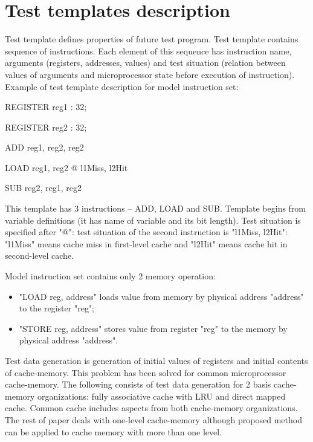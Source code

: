 \section{Test templates description}

Test template defines properties of future test program. Test
template contains sequence of instructions. Each element of this
sequence has instruction name, arguments (registers, addresses,
values) and test situation (relation between values of arguments and
microprocessor state before execution of instruction). Example of
test template description for model instruction set:

REGISTER reg1 : 32;

REGISTER reg2 : 32;

ADD reg1, reg2, reg2

LOAD reg1, reg2 @ l1Miss, l2Hit

SUB reg2, reg1, reg2

This template has 3 instructions -- ADD, LOAD and SUB. Template
begins from variable definitions (it has name of variable and its
bit length). Test situation is specified after "@": test situation
of the second instruction is "l1Miss, l2Hit": "l1Miss" means cache
miss in first-level cache and "l2Hit" means cache hit in
second-level cache.

Model instruction set contains only 2 memory operation:
\begin{itemize}
\item "LOAD reg, address" loads value from memory by physical address
"address" to the register "reg";
\item "STORE reg, address" stores value from register "reg" to the
memory by physical address "address".
\end{itemize}

Test data generation is generation of initial values of registers
and initial contents of cache-memory. This problem has been solved
for common microprocessor cache-memory. The following consists of
test data generation for 2 basis cache-memory organizations: fully
associative cache with LRU and direct mapped cache. Common cache
includes aspects from both cache-memory organizations. The rest of
paper deals with one-level cache-memory although proposed method can
be applied to cache memory with more than one level.
